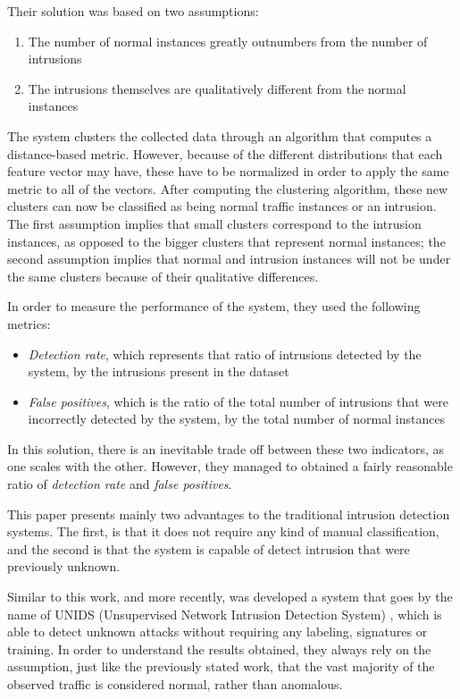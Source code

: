 \documentclass[runningheads,a4paper]{llncs}
\begin{document}
Their solution was based on two assumptions:
\begin{enumerate}
  \item The number of normal instances greatly outnumbers from the number of intrusions
  \item The intrusions themselves are qualitatively different from the normal instances
\end{enumerate}

The system clusters the collected data through an algorithm that computes a distance-based metric. However, because of the different distributions that each feature vector may have, these have to be normalized in order to apply the same metric to all of the vectors. After computing the clustering algorithm, these new clusters can now be classified as being normal traffic instances or an intrusion. The first assumption implies that small clusters correspond to the intrusion instances, as opposed to the bigger clusters that represent normal instances; the second assumption implies that normal and intrusion instances will not be under the same clusters because of their qualitative differences.


In order to measure the performance of the system, they used the following metrics:
\begin{itemize}
\item \textit{Detection rate}, which represents that ratio of intrusions detected by the system, by the intrusions present in the dataset
\item \textit{False positives}, which is the ratio of the total number of intrusions that were incorrectly detected by the system, by the total number of normal instances
\end{itemize}

In this solution, there is an inevitable trade off between these two indicators, as one scales with the other. However, they managed to obtained a fairly reasonable ratio of \textit{detection rate} and \textit{false positives}.

This paper presents mainly two advantages to the traditional intrusion detection systems. The first, is that it does not require any kind of manual classification, and the second is that the system is capable of detect intrusion that were previously unknown.

Similar to this work, and more recently, was developed a system that goes by the name of UNIDS (Unsupervised Network Intrusion Detection System) \cite{Casas2012}, which is able to detect unknown attacks without requiring any labeling, signatures or training. In order to understand the results obtained, they always rely on the assumption, just like the previously stated work, that the vast majority of the observed traffic is considered normal, rather than anomalous. 
\end{document}
